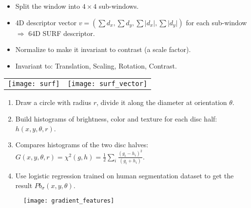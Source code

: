 \documentclass[11pt, a4paper, landscape]{article}
\begin{document}
\NewPage{}
\vfill
\begin{itemize}
\item Split the window into $4 \times 4$ sub-windows.
\item 4D descriptor vector $v = (\sum d_x, \sum d_y, \sum \lvert d_x \rvert, \sum \lvert d_y \rvert)$ for each sub-window $\Rightarrow$ 64D SURF descriptor.
\item Normalize to make it invariant to contrast (a scale factor).
\item Invariant to: Translation, Scaling, Rotation, Contrast.
\end{itemize}
\begin{table}
  \centering
  \begin{tabular}{@{} M{.5\linewidth} M{.5\linewidth} @{}}
      \texttt{[image: surf]}
      &
      \texttt{[image: surf\_vector]}%
  \end{tabular}
\end{table}
\vfill





\NewPage{}
\small
\vfill
\begin{enumerate}
\item Draw a circle with radius $r$, divide it along the diameter at orientation $\theta$.
\item Build histograms of brightness, color and texture for each disc half: $h(x, y, \theta, r)$.
\item Compares histograms of the two disc halves: $G(x, y, \theta, r) = \chi ^ 2 (g, h) = \frac{1}{2} \sum_i \frac{(g_i - h_i)^2}{(g_i + h_i)}$.
\item Use logistic regression trained on human segmentation dataset to get the result $Pb_{\sigma}(x, y, \theta)$.
\end{enumerate}
\begin{figure}
	\centering
	\texttt{[image: gradient\_features]}
\end{figure}
\vfill
\end{document}
